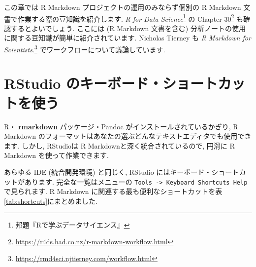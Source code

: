 \documentclass[
  11pt,
  lualatex,ja=standard,jafont=noto]{bxjsreport}
\renewcommand{\href}[2]{#2\footnote{\url{#1}}}
\begin{document}
この章では R Markdown プロジェクトの運用のみならず個別の R Markdown 文書で作業する際の豆知識を紹介します. \emph{R for Data Science}\footnote{邦題『Rで学ぶデータサイエンス』} \autocite{wickham2016} の \href{https://r4ds.had.co.nz/r-markdown-workflow.html}{Chapter 30} も確認するとよいでしょう. ここには (R Markdown 文書を含む) 分析ノートの使用に関する豆知識が簡単に紹介されています. Nicholas Tierney も \href{https://rmd4sci.njtierney.com/workflow.html}{\emph{R Markdown for Scientists}.} でワークフローについて議論しています.

\hypertarget{rstudio-shortcuts}{%
\section{RStudio のキーボード・ショートカットを使う}\label{rstudio-shortcuts}}

R・ \textbf{rmarkdown} パッケージ・Pandoc がインストールされているかぎり, R Markdown のフォーマットはあなたの選ぶどんなテキストエディタでも使用できます. しかし, RStudioは R Markdownと深く統合されているので, 円滑に R Markdown を使って作業できます.

あらゆる IDE (統合開発環境) と同じく, RStudio にはキーボード・ショートカットがあります. 完全な一覧はメニューの \texttt{Tools -\textgreater{}\ Keyboard\ Shortcuts\ Help} で見られます. R Markdown に関連する最も便利なショートカットを表\ref{tab:shortcuts}にまとめました.
\end{document}
